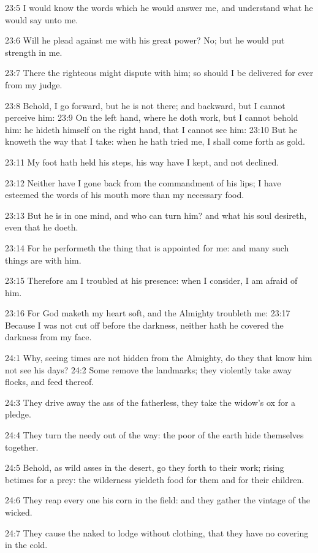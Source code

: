 23:5 I would know the words which he would answer me, and understand
what he would say unto me.

23:6 Will he plead against me with his great power? No; but he would
put strength in me.

23:7 There the righteous might dispute with him; so should I be
delivered for ever from my judge.

23:8 Behold, I go forward, but he is not there; and backward, but I
cannot perceive him: 23:9 On the left hand, where he doth work, but I
cannot behold him: he hideth himself on the right hand, that I cannot
see him: 23:10 But he knoweth the way that I take: when he hath tried
me, I shall come forth as gold.

23:11 My foot hath held his steps, his way have I kept, and not
declined.

23:12 Neither have I gone back from the commandment of his lips; I
have esteemed the words of his mouth more than my necessary food.

23:13 But he is in one mind, and who can turn him? and what his soul
desireth, even that he doeth.

23:14 For he performeth the thing that is appointed for me: and many
such things are with him.

23:15 Therefore am I troubled at his presence: when I consider, I am
afraid of him.

23:16 For God maketh my heart soft, and the Almighty troubleth me:
23:17 Because I was not cut off before the darkness, neither hath he
covered the darkness from my face.

24:1 Why, seeing times are not hidden from the Almighty, do they that
know him not see his days?  24:2 Some remove the landmarks; they
violently take away flocks, and feed thereof.

24:3 They drive away the ass of the fatherless, they take the widow's
ox for a pledge.

24:4 They turn the needy out of the way: the poor of the earth hide
themselves together.

24:5 Behold, as wild asses in the desert, go they forth to their work;
rising betimes for a prey: the wilderness yieldeth food for them and
for their children.

24:6 They reap every one his corn in the field: and they gather the
vintage of the wicked.

24:7 They cause the naked to lodge without clothing, that they have no
covering in the cold.

